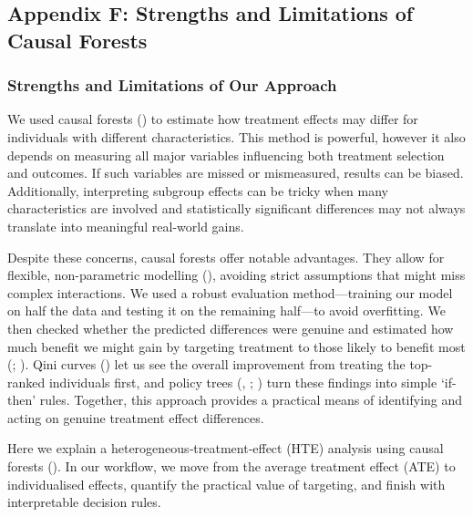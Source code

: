 \documentclass[
  single column]{article}
\begin{document}
\newpage{}

\subsection{Appendix F: Strengths and Limitations of Causal
Forests}\label{appendix-rate}

\subsubsection{Strengths and Limitations of Our
Approach}\label{strengths-and-limitations-of-our-approach}

We used causal forests ()
to estimate how treatment effects may differ for individuals with
different characteristics. This method is powerful, however it also
depends on measuring all major variables influencing both treatment
selection and outcomes. If such variables are missed or mismeasured,
results can be biased. Additionally, interpreting subgroup effects can
be tricky when many characteristics are involved and statistically
significant differences may not always translate into meaningful
real-world gains.

Despite these concerns, causal forests offer notable advantages. They
allow for flexible, non-parametric modelling
(), avoiding strict
assumptions that might miss complex interactions. We used a robust
evaluation method---training our model on half the data and testing it
on the remaining half---to avoid overfitting. We then checked whether
the predicted differences were genuine and estimated how much benefit we
might gain by targeting treatment to those likely to benefit most
(;
). Qini curves
() let us see the overall
improvement from treating the top-ranked individuals first, and policy
trees (,
;
) turn
these findings into simple `if-then' rules. Together, this approach
provides a practical means of identifying and acting on genuine
treatment effect differences.

Here we explain a heterogeneous‐treatment‐effect (HTE) analysis using
causal forests (). In our
workflow, we move from the average treatment effect (ATE) to
individualised effects, quantify the practical value of targeting, and
finish with interpretable decision rules.
\end{document}
